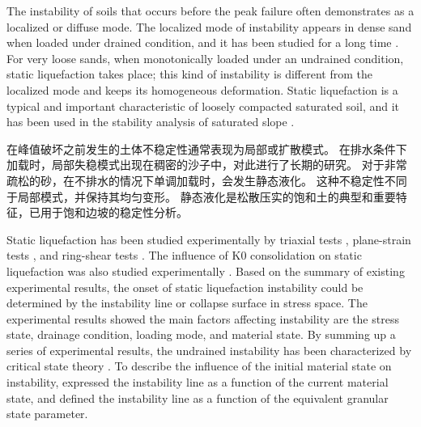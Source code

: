 \begin{ParaColumn}

    The instability of soils that occurs before the peak failure often demonstrates as a localized or diffuse mode. The localized mode of instability appears in dense sand when loaded under drained condition, and it has been studied for a long time \citep{Rudnicki1975,Andrade2006,Lu2011}. For very loose sands, when monotonically loaded under an undrained condition, static liquefaction takes place; this kind of instability is different from the localized mode and keeps its homogeneous deformation. Static liquefaction is a typical and important characteristic of loosely compacted saturated soil, and it has been used in the stability analysis of saturated slope \citep{Lade1992,Ellison2009}.

    \switchcolumn

    在峰值破坏之前发生的土体不稳定性通常表现为局部或扩散模式。 在排水条件下加载时，局部失稳模式出现在稠密的沙子中，对此进行了长期的研究\citep{Rudnicki1975,Andrade2006,Lu2011}。 对于非常疏松的砂，在不排水的情况下单调加载时，会发生静态液化。 这种不稳定性不同于局部模式，并保持其均匀变形。 静态液化是松散压实的饱和土的典型和重要特征，已用于饱和边坡的稳定性分析\citep{Lade1992,Ellison2009}。

    \switchcolumn*

    Static liquefaction has been studied experimentally by triaxial tests \citep{Sladen1985, Lade1990,Yamamuro1997,Doanh1997}, plane-strain tests \citep{Chu2008}, and ring-shear tests \citep{Liu2011}. The influence of K0 consolidation on static liquefaction was also studied experimentally \citep{Fourie2005, Chu2008}. Based on the summary of existing experimental results, the onset of static liquefaction instability could be determined by the instability line \citep{Lade1990} or collapse surface \citep{Sladen1985} in stress space. The experimental results \citep{Daouadji2010,Wanatowski2012} showed the main factors affecting instability are the stress state, drainage condition, loading mode, and material state. By summing up a series of experimental results, the undrained instability has been characterized by critical state theory \citep{Rahman2011,Bedin2012}. To describe the influence of the initial material state on instability, \citet{Yang2002} expressed the instability line as a function of the current material state, and \citet{Rahman2011} defined the instability line as a function of the equivalent granular state parameter.


\end{ParaColumn}
